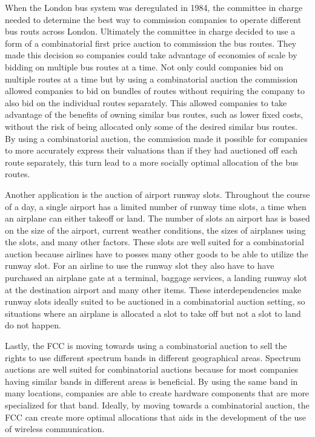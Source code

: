 \documentclass[10pt,onecolumn,letterpaper]{article}
\theoremstyle{definition}
\begin{document}
When the London bus system was deregulated in 1984, the committee in charge needed to determine the best way to commission companies to operate  different bus routs across London. Ultimately the committee in charge decided to use a form of a combinatorial first price auction to commission the bus routes. They made this decision so companies could take advantage of economies of scale by bidding on multiple bus routes at a time. Not only could companies bid on multiple routes at a time but by using a combinatorial auction the commission allowed companies to bid on bundles of routes without requiring the company to also bid on the individual routes separately. This allowed companies to take advantage of the benefits of owning similar bus routes, such as lower fixed costs, without the risk of being allocated only some of the desired similar bus routes. By using a combinatorial auction, the commission made it possible for companies to more accurately express their valuations than if they had auctioned off each route separately, this turn lead to a more socially optimal allocation of the bus routes.

Another application is the auction of airport runway slots. Throughout the course of a day, a single airport has a limited number of runway time slots, a time when an airplane can either takeoff or land. The number of slots an airport has is based on the size of the airport, current weather conditions, the sizes of airplanes using the slots, and many other factors. These slots are well suited for a combinatorial auction because airlines have to posses many other goods to be able to utilize the runway slot. For an airline to use the runway slot they also have to have purchased an airplane gate at a terminal, baggage services, a landing runway slot at the destination airport and many other items. These interdependencies make runway slots ideally suited to be auctioned in a combinatorial auction setting, so situations where an airplane is allocated a slot to take off but not a slot to land do not happen.

Lastly, the FCC is moving towards using a combinatorial auction to sell the rights to use different spectrum bands in different geographical areas. Spectrum auctions are well suited for combinatorial auctions because for most companies having similar bands in different areas is beneficial. By using the same band in many locations, companies are able to create hardware components that are more specialized for that band. Ideally, by moving towards a combinatorial auction, the FCC can create more optimal allocations that aids in the development of the use of wireless communication.
\end{document}
